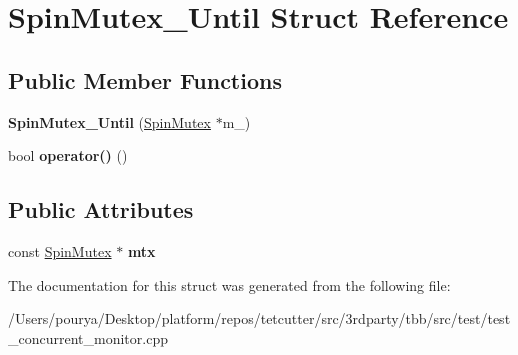 \hypertarget{structSpinMutex__Until}{}\section{Spin\+Mutex\+\_\+\+Until Struct Reference}
\label{structSpinMutex__Until}
\subsection*{Public Member Functions}
\begin{DoxyCompactItemize}
\item 
\hypertarget{structSpinMutex__Until_a32c7f4f8b15df27491ba30f1ae5d55ff}{}{\bfseries Spin\+Mutex\+\_\+\+Until} (\hyperlink{classSpinMutex}{Spin\+Mutex} $\ast$m\+\_\+)\label{structSpinMutex__Until_a32c7f4f8b15df27491ba30f1ae5d55ff}

\item 
\hypertarget{structSpinMutex__Until_a6c55adaa58cdee02a44f4b2a71cf4069}{}bool {\bfseries operator()} ()\label{structSpinMutex__Until_a6c55adaa58cdee02a44f4b2a71cf4069}

\end{DoxyCompactItemize}
\subsection*{Public Attributes}
\begin{DoxyCompactItemize}
\item 
\hypertarget{structSpinMutex__Until_a461d185435692bb7cea3bb08fcbea541}{}const \hyperlink{classSpinMutex}{Spin\+Mutex} $\ast$ {\bfseries mtx}\label{structSpinMutex__Until_a461d185435692bb7cea3bb08fcbea541}

\end{DoxyCompactItemize}


The documentation for this struct was generated from the following file\+:\begin{DoxyCompactItemize}
\item 
/\+Users/pourya/\+Desktop/platform/repos/tetcutter/src/3rdparty/tbb/src/test/test\+\_\+concurrent\+\_\+monitor.\+cpp\end{DoxyCompactItemize}
